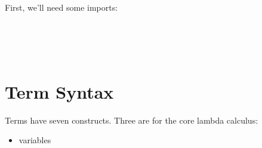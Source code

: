 \documentclass[runningheads]{llncs}
\begin{document}
First, we'll need some imports:
\begin{code}%
\>[0]\AgdaSpace{}%
\AgdaSpace{}%
\<%
\\
\>[0]\AgdaSpace{}%
\AgdaSpace{}%
\AgdaSpace{}%
\AgdaSpace{}%
\AgdaSymbol{(}\AgdaSymbol{;}\AgdaSpace{}%
\AgdaSymbol{;}\AgdaSpace{}%
\AgdaSymbol{;}\AgdaSpace{}%
\AgdaSymbol{;}\AgdaSpace{}%
\AgdaSymbol{)}\<%
\\
\>[0]\AgdaSpace{}%
\AgdaSpace{}%
\AgdaSpace{}%
\AgdaSpace{}%
\AgdaSymbol{(}\AgdaSymbol{;}\AgdaSpace{}%
\AgdaSymbol{)}\<%
\\
\>[0]\AgdaSpace{}%
\AgdaSpace{}%
\AgdaSpace{}%
\AgdaSpace{}%
\AgdaSymbol{(}\AgdaSymbol{;}\AgdaSpace{}%
\AgdaSymbol{;}\AgdaSpace{}%
\AgdaInductiveConstructor{[]}\AgdaSymbol{)}\<%
\end{code}

\section{Term Syntax}

Terms have seven constructs. Three are for the core lambda calculus:
\begin{itemize}
\item variables 
\end{itemize}
\end{document}
